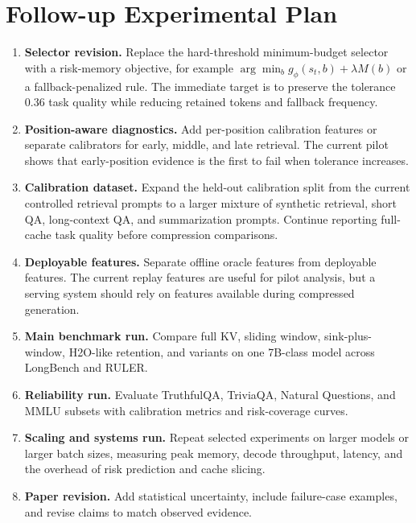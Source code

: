 \section{Follow-up Experimental Plan}

\begin{enumerate}[leftmargin=*]
    \item \textbf{Selector revision.} Replace the hard-threshold minimum-budget selector with a risk-memory objective, for example $\arg\min_b g_{\phi}(s_t,b)+\lambda M(b)$ or a fallback-penalized rule. The immediate target is to preserve the tolerance 0.36 task quality while reducing retained tokens and fallback frequency.
    \item \textbf{Position-aware diagnostics.} Add per-position calibration features or separate calibrators for early, middle, and late retrieval. The current pilot shows that early-position evidence is the first to fail when tolerance increases.
    \item \textbf{Calibration dataset.} Expand the held-out calibration split from the current controlled retrieval prompts to a larger mixture of synthetic retrieval, short QA, long-context QA, and summarization prompts. Continue reporting full-cache task quality before compression comparisons.
    \item \textbf{Deployable features.} Separate offline oracle features from deployable features. The current replay features are useful for pilot analysis, but a serving system should rely on features available during compressed generation.
    \item \textbf{Main benchmark run.} Compare full KV, sliding window, sink-plus-window, H2O-like retention, and \uckv{} variants on one 7B-class model across LongBench and RULER.
    \item \textbf{Reliability run.} Evaluate TruthfulQA, TriviaQA, Natural Questions, and MMLU subsets with calibration metrics and risk-coverage curves.
    \item \textbf{Scaling and systems run.} Repeat selected experiments on larger models or larger batch sizes, measuring peak memory, decode throughput, latency, and the overhead of risk prediction and cache slicing.
    \item \textbf{Paper revision.} Add statistical uncertainty, include failure-case examples, and revise claims to match observed evidence.
\end{enumerate}
